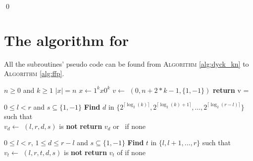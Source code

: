 \begin{appendix}
\begin{tproof}
        \qed

    \end{tproof}

    \newpage

    \section{The algorithm for }
    \label{annex:complete_subroutine_dyck_kn}
    All the subroutines' pseudo code can be found from \textsc{Algorithm}
    \autoref{alg:dyck_kn} to \textsc{Algorithm} \autoref{alg:ffp}.

    \begin{algorithm}[h!]
        \caption{}\label{alg:dyck_kn}
        \begin{algorithmic}
            \Require $n \geq 0$ and $k \geq 1$
            \Ensure $|x| = n $
            \State $x \gets 1^kx0^k$
            \State $v \gets$ $(0, n+2*k-1, \{1,-1\})$
            \State \textbf{return} v = \Null
        \end{algorithmic}
    \end{algorithm}

    \begin{algorithm}[h!]
        \caption{$(l,r,s)$}\label{alg:fa_k}
        \begin{algorithmic}
            \Require $0 \leq l < r$ and $s \subseteq \{1,-1\}$
            \State \textbf{Find} $d$ in $\{2^{\lceil \log_2(k)\rceil }, 2^{\lceil \log_2(k)+1\rceil },\ldots,2^{\lceil \log_2(r-l)\rceil }\}$
            such that \\
            \hspace*{1cm} $v_d \gets $ $(l,r,d,s)$ is \textbf{not} \Null
            \State \textbf{return} $v_d$ or \Null \ if none
        \end{algorithmic}
    \end{algorithm}

    \begin{algorithm}[h!]
        \caption{$(l,r,d,s)$}\label{alg:ffl_k}
        \begin{algorithmic}
            \Require $0 \leq l < r$, $1\leq d \leq r-l$ and $s \subseteq \{1,-1\}$
            \State \textbf{Find} $t$ in $\{l, l+1, \dots, r\}$ such that \\
            \hspace*{1cm} $v_t \gets$ $(l,r,t,d,s)$ is \textbf{not} \Null
            \State \textbf{return} $v_t$ of \Null if none
        \end{algorithmic}
    \end{algorithm}


\end{appendix}
